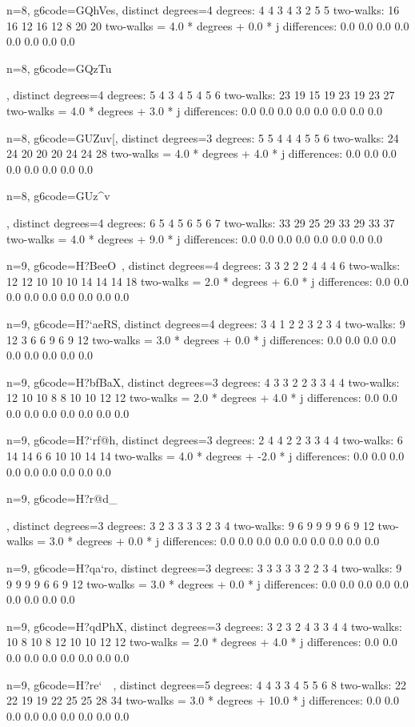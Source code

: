 {{{{{n=8, g6code=GQhVes, distinct degrees=4
degrees: 4 4 3 4 3 2 5 5 
two-walks: 16 16 12 16 12 8 20 20 
two-walks = 4.0 * degrees + 0.0 * j
differences: 0.0 0.0 0.0 0.0 0.0 0.0 0.0 0.0 

n=8, g6code=GQzTu{, distinct degrees=4
degrees: 5 4 3 4 5 4 5 6 
two-walks: 23 19 15 19 23 19 23 27 
two-walks = 4.0 * degrees + 3.0 * j
differences: 0.0 0.0 0.0 0.0 0.0 0.0 0.0 0.0 

n=8, g6code=GUZuv[, distinct degrees=3
degrees: 5 5 4 4 4 5 5 6 
two-walks: 24 24 20 20 20 24 24 28 
two-walks = 4.0 * degrees + 4.0 * j
differences: 0.0 0.0 0.0 0.0 0.0 0.0 0.0 0.0 

n=8, g6code=GUz^v{, distinct degrees=4
degrees: 6 5 4 5 6 5 6 7 
two-walks: 33 29 25 29 33 29 33 37 
two-walks = 4.0 * degrees + 9.0 * j
differences: 0.0 0.0 0.0 0.0 0.0 0.0 0.0 0.0 

n=9, g6code=H?BeeO~, distinct degrees=4
degrees: 3 3 2 2 2 4 4 4 6 
two-walks: 12 12 10 10 10 14 14 14 18 
two-walks = 2.0 * degrees + 6.0 * j
differences: 0.0 0.0 0.0 0.0 0.0 0.0 0.0 0.0 0.0 

n=9, g6code=H?`aeRS, distinct degrees=4
degrees: 3 4 1 2 2 3 2 3 4 
two-walks: 9 12 3 6 6 9 6 9 12 
two-walks = 3.0 * degrees + 0.0 * j
differences: 0.0 0.0 0.0 0.0 0.0 0.0 0.0 0.0 0.0 

n=9, g6code=H?bfBaX, distinct degrees=3
degrees: 4 3 3 2 2 3 3 4 4 
two-walks: 12 10 10 8 8 10 10 12 12 
two-walks = 2.0 * degrees + 4.0 * j
differences: 0.0 0.0 0.0 0.0 0.0 0.0 0.0 0.0 0.0 

n=9, g6code=H?`rf@h, distinct degrees=3
degrees: 2 4 4 2 2 3 3 4 4 
two-walks: 6 14 14 6 6 10 10 14 14 
two-walks = 4.0 * degrees + -2.0 * j
differences: 0.0 0.0 0.0 0.0 0.0 0.0 0.0 0.0 0.0 

n=9, g6code=H?r@d_{, distinct degrees=3
degrees: 3 2 3 3 3 3 2 3 4 
two-walks: 9 6 9 9 9 9 6 9 12 
two-walks = 3.0 * degrees + 0.0 * j
differences: 0.0 0.0 0.0 0.0 0.0 0.0 0.0 0.0 0.0 

n=9, g6code=H?qa`ro, distinct degrees=3
degrees: 3 3 3 3 3 2 2 3 4 
two-walks: 9 9 9 9 9 6 6 9 12 
two-walks = 3.0 * degrees + 0.0 * j
differences: 0.0 0.0 0.0 0.0 0.0 0.0 0.0 0.0 0.0 

n=9, g6code=H?qdPhX, distinct degrees=3
degrees: 3 2 3 2 4 3 3 4 4 
two-walks: 10 8 10 8 12 10 10 12 12 
two-walks = 2.0 * degrees + 4.0 * j
differences: 0.0 0.0 0.0 0.0 0.0 0.0 0.0 0.0 0.0 

n=9, g6code=H?re`~~, distinct degrees=5
degrees: 4 4 3 3 4 5 5 6 8 
two-walks: 22 22 19 19 22 25 25 28 34 
two-walks = 3.0 * degrees + 10.0 * j
differences: 0.0 0.0 0.0 0.0 0.0 0.0 0.0 0.0 0.0 

}}}}}}}}
